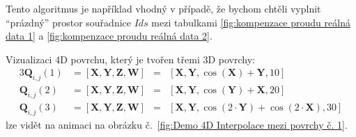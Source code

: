 Tento algoritmus je například vhodný v případě, že bychom chtěli vyplnit ``prázdný'' prostor souřadnice $Ids$ mezi tabulkami \ref{fig:kompenzace proudu reálná data 1} a \ref{fig:kompenzace proudu reálná data 2}.\par
Vizualizaci 4D povrchu, který je tvořen třemi 3D povrchy:
\begin{alignat}{3}
    \bm{Q}_{i,j}(1) & = [\bm{X}, \bm{Y}, \bm{Z}, \bm{W}] & = & [\bm{X}, \bm{Y}, \cos(\bm{X}) + \bm{Y}, 10]                   \\
    \bm{Q}_{i,j}(2) & = [\bm{X}, \bm{Y}, \bm{Z}, \bm{W}] & = & [\bm{X}, \bm{Y}, \cos(\bm{Y}) + \bm{X}, 20]                   \\
    \bm{Q}_{i,j}(3) & = [\bm{X}, \bm{Y}, \bm{Z}, \bm{W}] & = & [\bm{X}, \bm{Y}, \cos(2\cdot\bm{Y}) + \cos(2\cdot\bm{X}), 30]
\end{alignat}
lze vidět na animaci na obrázku č.~\ref{fig:Demo 4D Interpolace mezi povrchy č. 1}.
